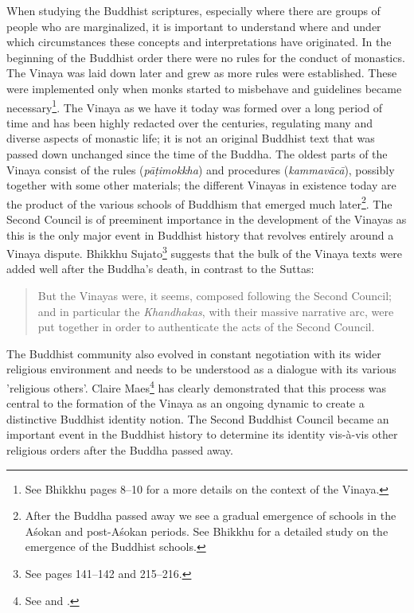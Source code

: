When studying the Buddhist scriptures, especially where there are groups of people who are marginalized, it is important to understand where and under which circumstances these concepts and interpretations have originated.
In the beginning of the Buddhist order there were no rules for the conduct of monastics. The Vinaya was laid down later and grew as more rules were established. These were implemented only when monks started to misbehave and guidelines became necessary\footnote{See Bhikkhu \cite{sujato2009} pages 8–10 for a more details on the context of the Vinaya.}. The Vinaya as we have it today was formed over a long period of time and has been highly redacted over the centuries, regulating many and diverse aspects of monastic life; it is not an original Buddhist text that was passed down unchanged since the time of the Buddha. The oldest parts of the Vinaya consist of the rules ({\em pāṭimokkha}) and procedures ({\em kammavācā}), possibly together with some other materials; the different Vinayas in existence today are the product of the various schools of Buddhism that emerged much later\footnote{After the Buddha passed away we see a gradual emergence of schools in the Aśokan and post-Aśokan periods. See Bhikkhu \cite{sujato2012} for a detailed study on the emergence of the Buddhist schools.}. The Second Council is of preeminent importance in the development of the Vinayas as this is the only major event in Buddhist history that revolves entirely around a Vinaya dispute. Bhikkhu Sujato\footnote{See \cite{sujato2009} pages 141–142 and 215–216.} suggests that the bulk of the Vinaya texts were added well after the Buddha's death, in contrast to the Suttas: 

\begin{quote}
But the Vinayas were, it seems, composed following the Second Council; and in particular the {\em Khandhakas}, with their massive narrative arc, were put together in order to authenticate the acts of the Second Council.
\end{quote}

The Buddhist community also evolved in constant negotiation with its wider religious environment and needs to be understood as a dialogue with its various 'religious others'. Claire Maes\footnote{See \cite{maes} and \cite{maes2016}.} has clearly demonstrated that this process was central to the formation of the Vinaya as an ongoing dynamic to create a distinctive Buddhist identity notion. The Second Buddhist Council became an important event in the Buddhist history to determine its identity vis-à-vis other religious orders after the Buddha passed away.

